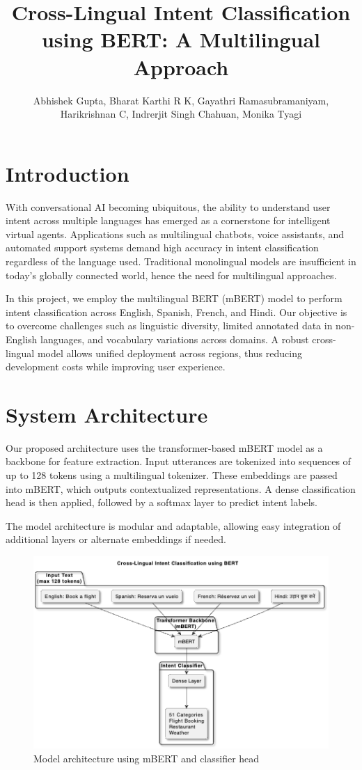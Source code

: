 \documentclass{ecai}
\title{Cross-Lingual Intent Classification using BERT: A Multilingual Approach}
\author{
Abhishek Gupta, Bharat Karthi R K, Gayathri Ramasubramaniyam,\\
Harikrishnan C, Indrerjit Singh Chahuan, Monika Tyagi\\
\institute{DA 225o Deep Learning (Summer 2025), Indian Institute of Science}
}
\begin{document}
\maketitle

\section{Introduction}
With conversational AI becoming ubiquitous, the ability to understand user intent across multiple languages has emerged as a cornerstone for intelligent virtual agents. Applications such as multilingual chatbots, voice assistants, and automated support systems demand high accuracy in intent classification regardless of the language used. Traditional monolingual models are insufficient in today's globally connected world, hence the need for multilingual approaches.

In this project, we employ the multilingual BERT (mBERT) model to perform intent classification across English, Spanish, French, and Hindi. Our objective is to overcome challenges such as linguistic diversity, limited annotated data in non-English languages, and vocabulary variations across domains. A robust cross-lingual model allows unified deployment across regions, thus reducing development costs while improving user experience.

\section{System Architecture}
Our proposed architecture uses the transformer-based mBERT model as a backbone for feature extraction. Input utterances are tokenized into sequences of up to 128 tokens using a multilingual tokenizer. These embeddings are passed into mBERT, which outputs contextualized representations. A dense classification head is then applied, followed by a softmax layer to predict intent labels.

The model architecture is modular and adaptable, allowing easy integration of additional layers or alternate embeddings if needed.

\begin{figure}[h]
\centering
\includegraphics[width=0.8\linewidth]{architecture.png}
\caption{Model architecture using mBERT and classifier head}
\end{figure}
\end{document}
